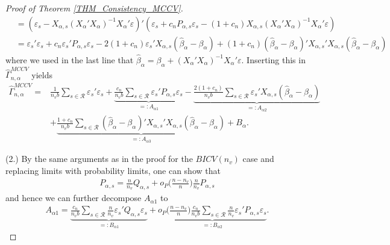\documentclass[Research_Module_ES.tex]{subfiles}
\begin{document}
\begin{proof}[Proof of Theorem \ref{THM_Consistency_MCCV}]
\begin{align*}
	&= (\varepsilon_s - X_{\alpha,s}(X_\alpha'X_\alpha)^{-1}X_\alpha'\varepsilon)'(\varepsilon_s + c_nP_{\alpha,s}\varepsilon_s -(1+c_n) X_{\alpha,s}(X_\alpha'X_\alpha)^{-1}X_\alpha'\varepsilon)  \\
	&= \varepsilon_s'\varepsilon_s + c_n \varepsilon_s'P_{\alpha,s}\varepsilon_s -2(1+c_n)\varepsilon_s' X_{\alpha,s}(\hat{\beta}_\alpha-\beta_\alpha) + (1+c_n)(\hat{\beta}_\alpha-\beta_\alpha)'X_{\alpha,s}'X_{\alpha,s}(\hat{\beta}_\alpha-\beta_\alpha)
	\end{align*}
	where we used in the last line that $\hat{\beta}_\alpha = \beta_\alpha + (X_\alpha'X_\alpha)^{-1}X_\alpha'\varepsilon$. Inserting this in $\hat{\Gamma}_{n,\alpha}^{MCCV}$ yields 
	\begin{align*}
	\hat{\Gamma}_{n,\alpha}^{MCCV} 
	= &\frac{1}{n_vb}\sum_{s\in \mathcal{R}}\varepsilon_s'\varepsilon_s 
	+ \underbrace{\frac{c_n}{n_vb}\sum_{s\in \mathcal{R}}\varepsilon_s'P_{\alpha,s}\varepsilon_s}_{=:A_{\alpha1}}
	- \underbrace{\frac{2(1+c_n)}{n_vb}\sum_{s\in \mathcal{R}}\varepsilon_s'X_{\alpha,s}(\hat{\beta}_\alpha-\beta_\alpha)}_{=:A_{\alpha2}}\\
	&+ \underbrace{\frac{1+c_n}{n_vb}\sum_{s\in \mathcal{R}}(\hat{\beta}_\alpha-\beta_\alpha)'X_{\alpha,s}'X_{\alpha,s}(\hat{\beta}_\alpha-\beta_\alpha)}_{=:A_{\alpha3}} + B_{\alpha}.
	\end{align*}
	
	(2.)
	By the same arguments as in the proof for the $BICV(n_v)$ case and replacing limits with probability limits, one can show that
	\begin{align*}
	P_{\alpha,s}=\frac{n}{n_v}Q_{\alpha,s}+o_P\biggl(\frac{n-n_v}{n}\biggr)\frac{n}{n_v}P_{\alpha,s}
	\end{align*}
	and hence we can further decompose $A_{\alpha1}$ to
	\begin{align*}
	A_{\alpha1}= \underbrace{\frac{c_n}{n_vb}\sum_{s\in\mathcal{R}}\frac{n}{n_v}\varepsilon_s'Q_{\alpha,s}\varepsilon_s}_{=:B_{\alpha1}}
	+ \underbrace{o_P\biggl(\frac{n-n_v}{n}\biggr)\frac{c_n}{n_vb}\sum_{s\in\mathcal{R}}\frac{n}{n_v}\varepsilon_s'P_{\alpha,s}\varepsilon_s}_{=:B_{\alpha2}}.
	\end{align*}
	

\end{proof}
\end{document}
